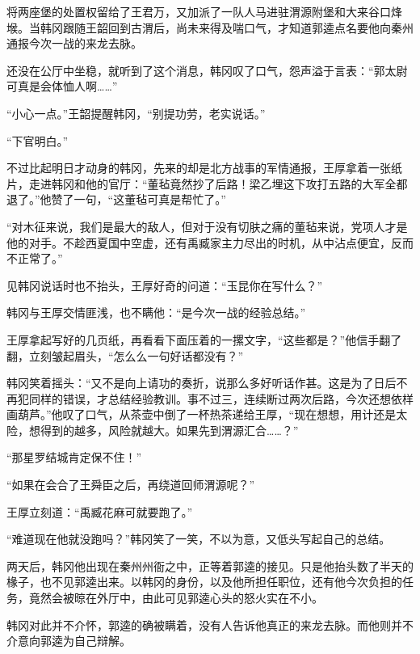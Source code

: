 将两座堡的处置权留给了王君万，又加派了一队人马进驻渭源附堡和大来谷口烽堠。当韩冈跟随王韶回到古渭后，尚未来得及喘口气，才知道郭逵点名要他向秦州通报今次一战的来龙去脉。

还没在公厅中坐稳，就听到了这个消息，韩冈叹了口气，怨声溢于言表：“郭太尉可真是会体恤人啊……”

“小心一点。”王韶提醒韩冈，“别提功劳，老实说话。”

“下官明白。”

不过比起明日才动身的韩冈，先来的却是北方战事的军情通报，王厚拿着一张纸片，走进韩冈和他的官厅：“董毡竟然抄了后路！梁乙埋这下攻打五路的大军全都退了。”他赞了一句，“这董毡可真是帮忙了。”

“对木征来说，我们是最大的敌人，但对于没有切肤之痛的董毡来说，党项人才是他的对手。不趁西夏国中空虚，还有禹臧家主力尽出的时机，从中沾点便宜，反而不正常了。”

见韩冈说话时也不抬头，王厚好奇的问道：“玉昆你在写什么？”

韩冈与王厚交情匪浅，也不瞒他：“是今次一战的经验总结。”

王厚拿起写好的几页纸，再看看下面压着的一摞文字，“这些都是？”他信手翻了翻，立刻皱起眉头，“怎么么一句好话都没有？”

韩冈笑着摇头：“又不是向上请功的奏折，说那么多好听话作甚。这是为了日后不再犯同样的错误，才总结经验教训。事不过三，连续断过两次后路，今次还想依样画葫芦。”他叹了口气，从茶壶中倒了一杯热茶递给王厚，“现在想想，用计还是太险，想得到的越多，风险就越大。如果先到渭源汇合……？”

“那星罗结城肯定保不住！”

“如果在会合了王舜臣之后，再绕道回师渭源呢？”

王厚立刻道：“禹臧花麻可就要跑了。”

“难道现在他就没跑吗？”韩冈笑了一笑，不以为意，又低头写起自己的总结。

两天后，韩冈他出现在秦州州衙之中，正等着郭逵的接见。只是他抬头数了半天的椽子，也不见郭逵出来。以韩冈的身份，以及他所担任职位，还有他今次负担的任务，竟然会被晾在外厅中，由此可见郭逵心头的怒火实在不小。

韩冈对此并不介怀，郭逵的确被瞒着，没有人告诉他真正的来龙去脉。而他则并不介意向郭逵为自己辩解。

